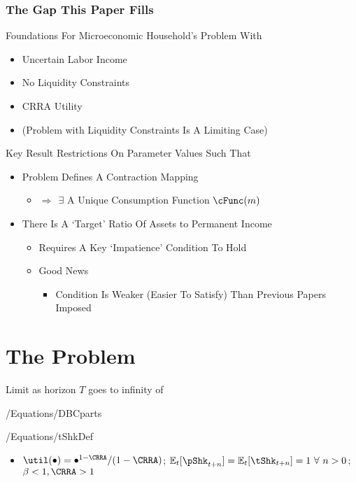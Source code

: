 \documentclass[pdflatex]{beamer}\providecommand{\texname}{BufferStockTheory-Slides}%
\providecommand{\EqDir}{\econtexRoot/Equations}
\providecommand{\Ex}{\mathbb{E}}
\begin{document}
\begin{frame}
\frametitle{The Gap This Paper Fills}

\pause Foundations For Microeconomic Household's Problem With
\begin{itemize}
\item Uncertain Labor Income
\item No Liquidity Constraints
\item CRRA Utility
\item (Problem with Liquidity Constraints Is A Limiting Case)
\end{itemize}

\end{frame}
\begin{frame}{Key Result}
\pause
Restrictions On Parameter Values Such That \pause
\begin{itemize}
\item Problem Defines A Contraction Mapping
\begin{itemize}
\item $\Rightarrow~~\exists $ A Unique Consumption Function $\cFunc(m)$
\end{itemize}
\item There Is A `Target' Ratio Of Assets to Permanent Income
\begin{itemize}
\item Requires A Key `Impatience' Condition To Hold
\item Good News
\begin{itemize} \item Condition Is Weaker (Easier To Satisfy) Than Previous Papers Imposed \end{itemize}
\end{itemize}
\end{itemize}

\end{frame}

\section{The Problem}

\begin{frame}

Limit as horizon $T$ goes to infinity of 

 \EqDir/DBCparts

 \EqDir/tShkDef

\begin{itemize}
\item $\util(\bullet)=\bullet^{1-\CRRA}/(1-\CRRA)$; $\Ex_{t}[\pShk_{t+n}]=\Ex_{t}[\tShk_{t+n}]=1~\forall~n>0$; $\beta < 1, \CRRA > 1$
\end{itemize}

\end{frame}
\end{document}
